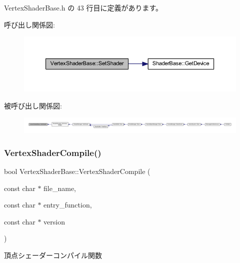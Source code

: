  Vertex\+Shader\+Base.\+h の 43 行目に定義があります。

呼び出し関係図\+:\nopagebreak
\begin{figure}[H]
\begin{center}
\leavevmode
\includegraphics[width=350pt]{class_vertex_shader_base_a9f93697c5668852850f0a7b7ef7cb67f_cgraph}
\end{center}
\end{figure}
被呼び出し関係図\+:
\nopagebreak
\begin{figure}[H]
\begin{center}
\leavevmode
\includegraphics[width=350pt]{class_vertex_shader_base_a9f93697c5668852850f0a7b7ef7cb67f_icgraph}
\end{center}
\end{figure}
\mbox{\label{class_vertex_shader_base_a6565abadb8ac173d3273ab1698d31c6c}} 
\subsubsection{\texorpdfstring{Vertex\+Shader\+Compile()}{VertexShaderCompile()}}
{\footnotesize\ttfamily bool Vertex\+Shader\+Base\+::\+Vertex\+Shader\+Compile (\begin{DoxyParamCaption}\item[{const char $\ast$}]{file\+\_\+name,  }\item[{const char $\ast$}]{entry\+\_\+function,  }\item[{const char $\ast$}]{version }\end{DoxyParamCaption})\hspace{0.3cm}{\ttfamily [inline]}}



頂点シェーダーコンパイル関数 


